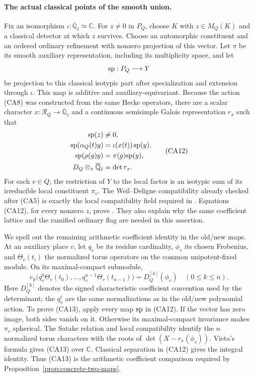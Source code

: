 \paragraph{The actual classical points of the smooth union.}
Fix an isomorphism
\(\iota:\overline{\mathbb Q}_\ell\simeq\mathbb C\).
For \(z\ne0\) in \(P_Q\), choose \(K\) with
\(z\in M_Q(K)\) and a classical detector at which \(z\)
survives. Choose an automorphic constituent and an ordered
ordinary refinement with nonzero projection of this
vector. Let \(\pi\) be its smooth auxiliary representation,
including its multiplicity space, and let
\[
 {\rm sp}:P_Q\longrightarrow Y
\]
be projection to this classical isotypic part after
specialization and extension through \(\iota\).
This map is additive and auxiliary-equivariant. Because
the action (CA8) was constructed from the same Hecke
operators, there are a scalar character
\(x:\mathcal R_Q\to\overline{\mathbb Q}_\ell\) and a
continuous semisimple Galois representation \(r_x\) such that
\[
 \begin{split}
 {\rm sp}(z)&\ne0,\\
 {\rm sp}(\alpha_Q(t)y)&=\iota(x(t))\,{\rm sp}(y),\\
 {\rm sp}(\rho(g)y)&=\pi(g){\rm sp}(y),\\
 D_Q\otimes_x\overline{\mathbb Q}_\ell&=\det r_x .
 \end{split}                                                \tag{CA12}
\]
For each \(v\in Q\), the restriction of \(Y\) to the local
factor is an isotypic sum of its irreducible local
constituent \(\pi_v\).
The Weil--Deligne compatibility already checked after
(CA5) is exactly the local compatibility field required
in . Equations (CA12), for every nonzero
\(z\), prove .
They also explain why the same coefficient lattice and
the ramified ordinary flag are needed in this assertion.

We spell out the remaining arithmetic coefficient
identity in the old/new maps.
At an auxiliary place \(v\), let \(q_v\) be its residue
cardinality, \(\phi_v\) its chosen Frobenius, and
\(\Theta_v(t_i)\) the normalized torus operators on the
common unipotent-fixed module.
On its maximal-compact submodule,
\[
 e_k\bigl(q_v^0\Theta_v(t_0),\ldots,
          q_v^{n-1}\Theta_v(t_{n-1})\bigr)
       =D_Q^{[k]}(\phi_v)\quad(0\leq k\leq n).             \tag{CA13}
\]
Here \(D_Q^{[k]}\) denotes the signed characteristic
coefficient convention used by the determinant;
the \(q_v^i\) are the same normalizations as in the
old/new polynomial action.
To prove (CA13), apply every map \({\rm sp}\) in (CA12).
If the vector has zero image, both sides vanish on it.
Otherwise its maximal-compact invariance makes
\(\pi_v\) spherical. The Satake relation and local
compatibility identify the \(n\) normalized torus
characters with the roots of
\(\det(X-r_x(\phi_v))\). Vieta's formula gives (CA13)
over \(\mathbb C\).
Classical separation in (CA12) gives the integral
identity. Thus (CA13) is the arithmetic coefficient
comparison required by
Proposition~\ref{prop:concrete-two-maps}.

